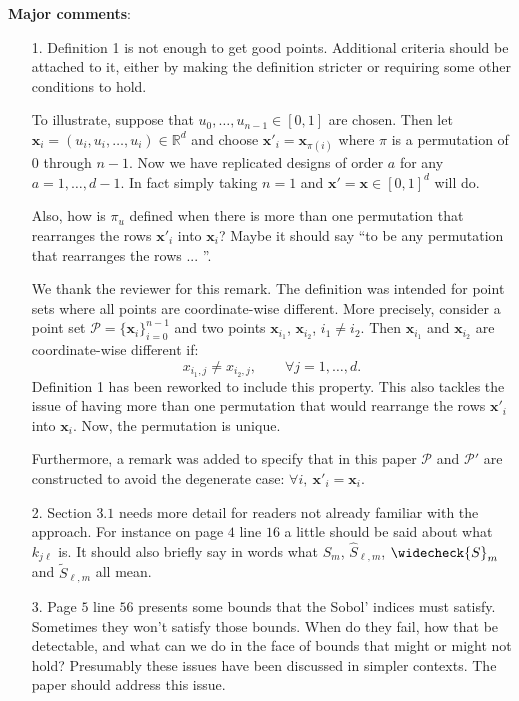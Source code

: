 \documentclass[10pt,a4paper]{article}
\newcommand{\vect}[1]{\boldsymbol{\mathbf{#1}}}
\newcommand{\vx}{\vect{x}}
\newcommand{\hS}{\widehat{S}}
\newcommand{\tS}{\widetilde{S}}
\newcommand{\wcS}{\widecheck{S}}
\begin{document}
\textbf{Major comments}:
\begin{itemize}
\item[1.] Definition 1 is not enough to get good points. Additional criteria should be attached to it, either by making the definition stricter or requiring some
other conditions to hold.

To illustrate, suppose that $u_0,\dots,u_{n-1} \in [0,1]$ are chosen. Then let $\vx_i = (u_i, u_i, \dots,u_i) \in \mathbb{R}^d$ and choose $\vx'_i= \vx_{\pi(i)}$ where $\pi$ is a permutation
of $0$ through $n-1$. Now we have replicated designs of order $a$ for any $a = 1,\dots,d-1$. In fact simply taking $n = 1$ and $\vx'=\vx \in [0,1]^d$ will do.

Also, how is $\pi_u$ defined when there is more than one permutation that rearranges the rows $\vx'_i$ into $\vx_i$? Maybe it should say ``to be any permutation
that rearranges the rows ... ''.

{\color{blue} We thank the reviewer for this remark. The definition was intended for point sets where all points are coordinate-wise different. More precisely, consider a point set $\mathcal{P}=\{\vx_i\}_{i=0}^{n-1}$ and two points $\vx_{i_1}$, $\vx_{i_2}$, $i_1 \neq i_2$. Then $\vx_{i_1}$ and $\vx_{i_2}$ are coordinate-wise different if: 
$$ x_{i_1,j} \neq x_{i_2,j}, \qquad \forall j=1,\dots,d .$$
Definition 1 has been reworked to include this property. This also tackles the issue of having more than one permutation that would rearrange the rows $\vx'_i$ into $\vx_i$. Now, the permutation is unique.

Furthermore, a remark was added to specify that in this paper $\mathcal{P}$ and $\mathcal{P}'$ are constructed to avoid the degenerate case: $\forall i, \ \vx'_i=\vx_i$.}



\item[2.] Section $3.1$ needs more detail for readers not already familiar with the approach. For instance on page $4$ line $16$ a little should be said about what $k_{j\ell}$ is. It should also briefly say in words what $S_m$, $\hS_{\ell,m}$, $\wcS_m$ and $\tS_{\ell,m}$ all mean.

\item[3.] Page $5$ line $56$ presents some bounds that the Sobol' indices must satisfy. Sometimes they won't satisfy those bounds. When do they fail, how that
be detectable, and what can we do in the face of bounds that might or might not hold? Presumably these issues have been discussed in simpler contexts. The paper should address this issue.


\end{itemize}
\end{document}
